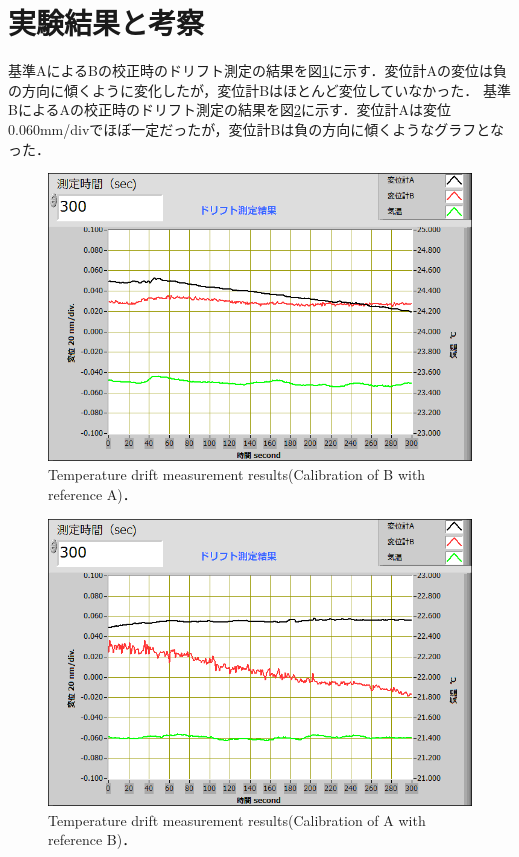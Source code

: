 \section{実験結果と考察}
基準AによるBの校正時のドリフト測定の結果を図\ref{fig:ドリフト1}に示す．変位計Aの変位は負の方向に傾くように変化したが，変位計Bはほとんど変位していなかった．
基準BによるAの校正時のドリフト測定の結果を図\ref{fig:ドリフト2}に示す．変位計Aは変位0.060mm/divでほぼ一定だったが，変位計Bは負の方向に傾くようなグラフとなった．

\begin{figure}[htbp]
    \centering %
    \includegraphics[width=100truemm,clip]{fig/温度ドリフト測定結果(Step1前)_A.png}
    \caption{Temperature drift measurement results(Calibration of B with reference A)．}
    \label{fig:ドリフト1}
\end{figure}
\begin{figure}[htbp]
    \centering %
    \includegraphics[width=100truemm,clip]{fig/温度ドリフト測定結果(Step2前)_A.png}
    \caption{Temperature drift measurement results(Calibration of A with reference B)．}
    \label{fig:ドリフト2}
\end{figure}

